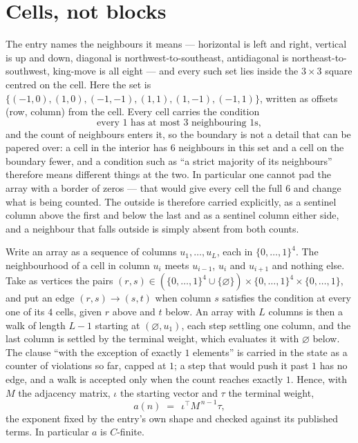 \documentclass[11pt,a4paper]{article}
\theoremstyle{plain}
\theoremstyle{definition}
\begin{document}
\section{Cells, not blocks}

The entry names the neighbours it means --- horizontal is left and right, vertical is up and
down, diagonal is northwest-to-southeast, antidiagonal is northeast-to-southwest, king-move is
all eight --- and every such set lies inside the $3\times3$ square centred on the cell. Here
the set is $\{(-1,0), (1,0), (-1,-1), (1,1), (1,-1), (-1,1)\}$, written as offsets (row, column) from the cell. Every cell carries
the condition
\[
\text{every 1 has at most 3 neighbouring 1s},
\]
and the count of neighbours enters it, so the boundary is not a detail that can be papered
over: a cell in the interior has $6$ neighbours in this set and a cell on the boundary
fewer, and a condition such as ``a strict majority of its neighbours'' therefore means
different things at the two. In particular one cannot pad the array with a border of zeros ---
that would give every cell the full $6$ and change what is being counted. The outside is
therefore carried
explicitly, as a sentinel column above the first and below the last and as a sentinel column
either side, and a neighbour that falls outside is simply absent from both counts.

Write an array as a sequence of columns $u_1,\dots,u_L$, each in
$\{0,\dots,1\}^{4}$. The neighbourhood of a cell in column $u_i$ meets $u_{i-1}$,
$u_i$ and $u_{i+1}$ and nothing else. Take as vertices the pairs
$(r,s)\in(\{0,\dots,1\}^{4}\cup\{\varnothing\})\times\{0,\dots,1\}^{4} \times \{0,\dots,1\}$,
and put an edge $(r,s)\to(s,t)$ when column $s$ satisfies the condition at every one of its
$4$ cells, given $r$ above and $t$ below. An array with $L$ columns is then a walk of length
$L-1$ starting at $(\varnothing,u_1)$, each step settling one column, and the last column is
settled by the terminal weight, which evaluates it with $\varnothing$ below. The clause ``with the exception of exactly $1$ elements'' is carried in
the state as a counter of violations so far, capped at $1$; a step that would push it past
$1$ has no edge, and a walk is accepted only when the count reaches exactly $1$. Hence,
with $M$ the adjacency matrix, $\iota$ the starting vector and $\tau$ the terminal weight,
\[
a(n)\;=\;\,\iota^{\!\top}M^{\,n-1}\tau ,
\]
the exponent fixed by the entry's own shape and checked against its published terms. In
particular $a$ is $C$-finite.
\end{document}
